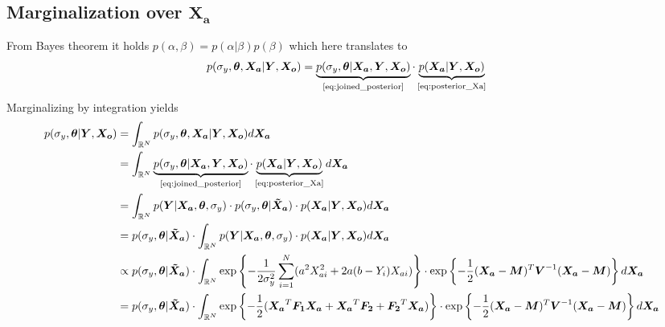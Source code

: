 \documentclass[10pt]{article}
\renewcommand{\vec}[1]{\boldsymbol{#1}}
\newcommand{\mat}[1]{\boldsymbol{#1}}
\begin{document}
\subsection{Marginalization over $\vec{X_a}$}
From Bayes theorem it holds $p(\alpha, \beta) = p(\alpha|\beta) p(\beta)$ which here translates to
\begin{align}
    p(\sigma_y, \vec{\theta}, \vec{X_a} | \vec{Y}, \vec{X_o}) &= \underbrace{p(\sigma_y, \vec{\theta} | \vec{X_a}, \vec{Y}, \vec{X_o})}_{\text{\cref{eq:joined_posterior}}} \cdot \underbrace{p(\vec{X_a} | \vec{Y}, \vec{X_o})}_{\text{\cref{eq:posterior_Xa}}}
\end{align}
Marginalizing by integration yields
{\tiny
\begin{align}
    p(\sigma_y, \vec{\theta} | \vec{Y}, \vec{X_o}) &= \int_{\mathbb{R}^N} p(\sigma_y, \vec{\theta}, \vec{X_a} | \vec{Y}, \vec{X_o}) d\vec{X_a} \\
    
    &= \int_{\mathbb{R}^N} 
        \underbrace{p(\sigma_y, \vec{\theta} | \vec{X_a}, \vec{Y}, \vec{X_o})}_{\text{\cref{eq:joined_posterior}}} \cdot 
        \underbrace{p(\vec{X_a} | \vec{Y}, \vec{X_o})}_{\text{\cref{eq:posterior_Xa}}} d\vec{X_a} \\
    
    &= \int_{\mathbb{R}^N} 
        p(\vec{Y} | \vec{X_a}, \vec{\theta}, \sigma_y) \cdot 
        p(\sigma_y, \vec{\theta} | \vec{\tilde{X}_a}) \cdot 
        p(\vec{X_a} | \vec{Y}, \vec{X_o}) d\vec{X_a} \\
    
    &= p(\sigma_y, \vec{\theta} | \vec{\tilde{X}_a}) \cdot 
    \int_{\mathbb{R}^N} 
        p(\vec{Y} | \vec{X_a}, \vec{\theta}, \sigma_y) \cdot 
        p(\vec{X_a} | \vec{Y}, \vec{X_o}) d\vec{X_a} \\
        
    &\propto p(\sigma_y, \vec{\theta} | \vec{\tilde{X}_a}) \cdot 
    \int_{\mathbb{R}^N} 
        \exp\left\{- \frac{1}{2\sigma_y^2} \sum_{i=1}^N (a^2 X_{ai}^2  + 2 a (b - Y_i) X_{ai} ) \right\} \cdot 
        \exp\left\{- \frac{1}{2} (\vec{X_a} - \vec{M})^T \mat{V}^{-1} (\vec{X_a} - \vec{M}) \right\} d\vec{X_a} \\
        
    &= p(\sigma_y, \vec{\theta} | \vec{\tilde{X}_a}) \cdot 
    \int_{\mathbb{R}^N} 
        \exp\left\{- \frac{1}{2} (\vec{X_a}^T \mat{F_1} \vec{X_a} + \vec{X_a}^T \vec{F_2} + \vec{F_2}^T \vec{X_a}) \right\} \cdot 
        \exp\left\{- \frac{1}{2} (\vec{X_a} - \vec{M})^T \mat{V}^{-1} (\vec{X_a} - \vec{M}) \right\} d\vec{X_a} \\
        

\end{align}}
\end{document}
